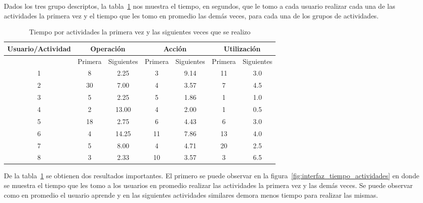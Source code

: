 Dados los tres grupo descriptos, la tabla~\ref{tab:interfaz_tiempo_actividades}
nos muestra el tiempo, en segundos, que le tomo a cada usuario realizar cada una
de las actividades la primera vez y el tiempo que les tomo en promedio las demás
veces, para cada una de los grupos de actividades.

\begin{table}[!hbt]
\centering
\begin{tabular}{|c|c|c|c|c|c|c|}
\hline
\rowcolor{gris} \textbf{Usuario/Actividad} & \multicolumn{2}{|c|}{\textbf{Operación}} & \multicolumn{2}{|c|}{\textbf{Acción}} & \multicolumn{2}{|c|}{\textbf{Utilización}}\\
\hline
\rowcolor{gris}  & Primera & Siguientes & Primera & Siguientes & Primera & Siguientes \\
\hline 1 & 8  & 2.25  & 3  & 9.14 & 11 & 3.0 \\
\hline 2 & 30 & 7.00  & 4  & 3.57 & 7  & 4.5 \\
\hline 3 & 5  & 2.25  & 5  & 1.86 & 1  & 1.0 \\
\hline 4 & 2  & 13.00 & 4  & 2.00 & 1  & 0.5 \\
\hline 5 & 18 & 2.75  & 6  & 4.43 & 6  & 3.0 \\
\hline 6 & 4  & 14.25 & 11 & 7.86 & 13 & 4.0 \\
\hline 7 & 5  & 8.00  & 4  & 4.71 & 20 & 2.5 \\
\hline 8 & 3  & 2.33  & 10 & 3.57 & 3  & 6.5 \\
\hline
\end{tabular}
\caption{Tiempo por actividades la primera vez y las siguientes veces que se realizo}
\label{tab:interfaz_tiempo_actividades}
\end{table}


De la tabla~\ref{tab:interfaz_tiempo_actividades} se obtienen dos resultados
importantes. El primero se puede observar en la
figura~\ref{fig:interfaz_tiempo_actividades} en donde se muestra el tiempo que
les tomo a los usuarios en promedio realizar las actividades la primera vez y
las demás veces. Se puede observar como en promedio el usuario aprende y en las
siguientes actividades similares demora menos tiempo para realizar las mismas.


